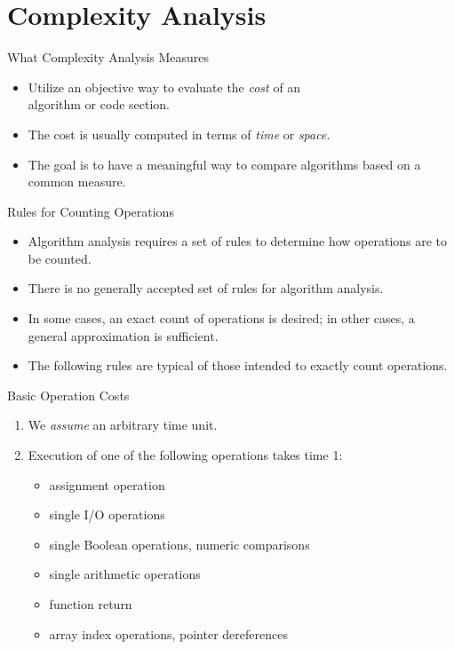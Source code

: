 \documentclass[14pt,aspectratio=1610, hyperref={pdfpagelayout=SinglePage}]{beamer}
\begin{document}
\section{Complexity Analysis}

\begin{frame}{What Complexity Analysis Measures}
\begin{itemize}[<+->]
\item Utilize an objective way to evaluate the \emph{cost} of an\\ algorithm or code section.
\item The cost is usually computed in terms of \emph{time} or \emph{space}.
\item The goal is to have a meaningful way to compare algorithms based on a common measure.
\end{itemize}
\end{frame}


\begin{frame}{Rules for Counting Operations}
\begin{itemize}[<+->]
\item Algorithm analysis requires a set of rules to determine how operations are to be counted.
\item There is no generally accepted set of rules for algorithm analysis.
\item In some cases, an exact count of operations is desired; in other cases, a general approximation is sufficient.
\item The following rules are typical of those intended to exactly count operations.
\end{itemize}
\end{frame}


\begin{frame}{Basic Operation Costs}
\begin{enumerate}
\item We \emph{assume} an arbitrary time unit.
\item Execution of one of the following operations takes time 1:
  \begin{itemize}
  \item assignment operation
  \item single I/O operations
  \item single Boolean operations, numeric comparisons
  \item single arithmetic operations
  \item function return
  \item array index operations, pointer dereferences
  \end{itemize}
\end{enumerate}
\end{frame}
\end{document}
